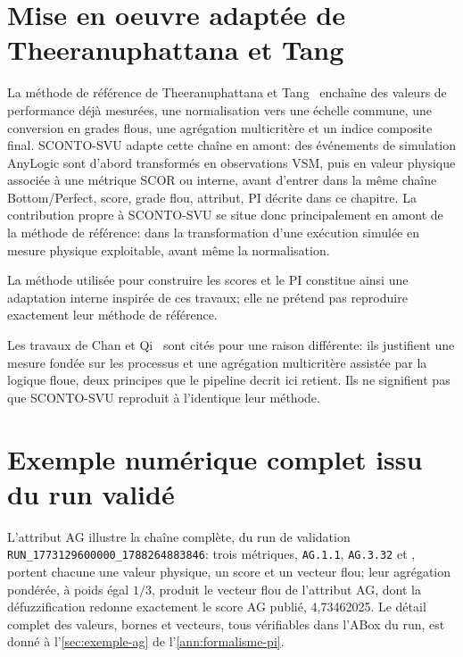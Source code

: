 
\section{Mise en oeuvre adaptée de Theeranuphattana et Tang}


La méthode de référence de Theeranuphattana et Tang~\cite{theeranuphattanatang2008,theeranuphattanatangkhang2012} enchaîne des valeurs de performance déjà mesurées, une normalisation vers une échelle commune, une conversion en grades flous, une agrégation multicritère et un indice composite final. SCONTO-SVU adapte cette chaîne en amont: des événements de simulation AnyLogic sont d'abord transformés en observations VSM, puis en valeur physique associée à une métrique SCOR ou interne, avant d'entrer dans la même chaîne Bottom/Perfect, score, grade flou, attribut, PI décrite dans ce chapitre. La contribution propre à SCONTO-SVU se situe donc principalement en amont de la méthode de référence: dans la transformation d'une exécution simulée en mesure physique exploitable, avant même la normalisation.

La méthode utilisée pour construire les scores et le PI constitue ainsi une adaptation interne inspirée de ces travaux; elle ne prétend pas reproduire exactement leur méthode de référence.

Les travaux de Chan et Qi~\cite{chanqi2003} sont cités pour une raison différente: ils justifient une mesure fondée sur les processus et une agrégation multicritère assistée par la logique floue, deux principes que le pipeline decrit ici retient. Ils ne signifient pas que SCONTO-SVU reproduit à l'identique leur méthode.

\section{Exemple numérique complet issu du run validé}

L'attribut AG illustre la chaîne complète, du run de validation \texttt{RUN\_1773129600000\_1788264883846}: trois métriques, \texttt{AG.1.1}, \texttt{AG.3.32} et , portent chacune une valeur physique, un score et un vecteur flou; leur agrégation pondérée, à poids égal $1/3$, produit le vecteur flou de l'attribut AG, dont la défuzzification redonne exactement le score AG publié, 4,73462025. Le détail complet des valeurs, bornes et vecteurs, tous vérifiables dans l'ABox du run, est donné à l'\cref{sec:exemple-ag} de l'\cref{ann:formalisme-pi}.

